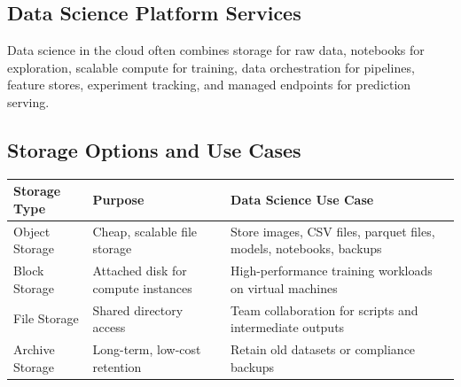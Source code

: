 \documentclass[11pt,a4paper]{article}
\begin{document}
\subsection{Data Science Platform Services}

\begin{conceptbox}
Data science in the cloud often combines storage for raw data, notebooks for exploration, scalable compute for training, data orchestration for pipelines, feature stores, experiment tracking, and managed endpoints for prediction serving.
\end{conceptbox}

\begin{center}
\end{center}

\subsection{Storage Options and Use Cases}

\begin{longtable}{p{3.0cm}p{4.1cm}p{6.2cm}}
\toprule
\textbf{Storage Type} & \textbf{Purpose} & \textbf{Data Science Use Case} \\
\midrule
Object Storage & Cheap, scalable file storage & Store images, CSV files, parquet files, models, notebooks, backups \\
Block Storage & Attached disk for compute instances & High-performance training workloads on virtual machines \\
File Storage & Shared directory access & Team collaboration for scripts and intermediate outputs \\
Archive Storage & Long-term, low-cost retention & Retain old datasets or compliance backups \\
\bottomrule
\end{longtable}
\end{document}
